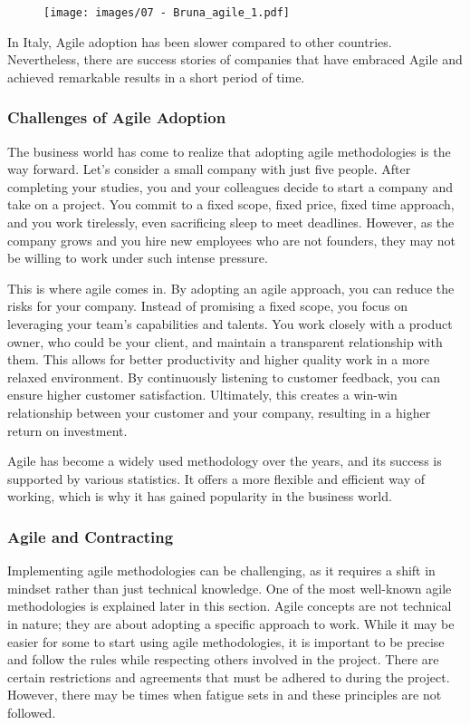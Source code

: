 \begin{figure}[!h]
    \centering
    \texttt{[image: images/07 - Bruna\_agile\_1.pdf]}
\end{figure}

In Italy, Agile adoption has been slower compared to other countries.
Nevertheless, there are success stories of companies that have embraced
Agile and achieved remarkable results in a short period of time.

\subsubsection{Challenges of Agile Adoption}

The business world has come to realize that adopting agile methodologies
is the way forward. Let's consider a small company with just five
people. After completing your studies, you and your colleagues decide to
start a company and take on a project. You commit to a fixed scope,
fixed price, fixed time approach, and you work tirelessly, even
sacrificing sleep to meet deadlines. However, as the company grows and
you hire new employees who are not founders, they may not be willing to
work under such intense pressure.

This is where agile comes in. By adopting an agile approach, you can
reduce the risks for your company. Instead of promising a fixed scope,
you focus on leveraging your team's capabilities and talents. You work
closely with a product owner, who could be your client, and maintain a
transparent relationship with them. This allows for better productivity
and higher quality work in a more relaxed environment. By continuously
listening to customer feedback, you can ensure higher customer
satisfaction. Ultimately, this creates a win-win relationship between
your customer and your company, resulting in a higher return on
investment.

Agile has become a widely used methodology over the years, and its
success is supported by various statistics. It offers a more flexible
and efficient way of working, which is why it has gained popularity in
the business world.

\subsubsection{Agile and Contracting}

Implementing agile methodologies can be challenging, as it requires a
shift in mindset rather than just technical knowledge. One of the most
well-known agile methodologies is explained later in this section. Agile
concepts are not technical in nature; they are about adopting a specific
approach to work. While it may be easier for some to start using agile
methodologies, it is important to be precise and follow the rules while
respecting others involved in the project. There are certain
restrictions and agreements that must be adhered to during the project.
However, there may be times when fatigue sets in and these principles
are not followed.

